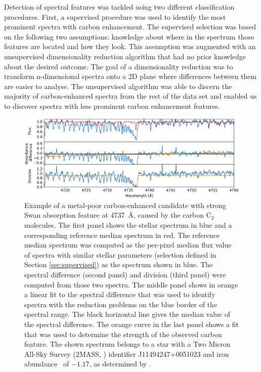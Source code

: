 Detection of spectral features was tackled using two different classification procedures. First, a supervised procedure was used to identify the most prominent spectra with carbon enhancement. The supervised selection was based on the following two assumptions: knowledge about where in the spectrum those features are located and how they look. This assumption was augmented with an unsupervised dimensionality reduction algorithm that had no prior knowledge about the desired outcome. The goal of a dimensionality reduction was to transform n-dimensional spectra onto a 2D plane where differences between them are easier to analyse. The unsupervised algorithm was able to discern the majority of carbon-enhanced spectra from the rest of the data set and enabled us to discover spectra with less prominent carbon enhancement features.

\begin{figure}
	\centering
	\includegraphics[width=\textwidth]{cemp_cand_150412003601009.png}
	\caption{Example of a metal-poor carbon-enhanced candidate with strong Swan absorption feature at 4737~\AA, caused by the carbon C$_2$ molecules. The first panel shows the stellar spectrum in blue and a corresponding reference median spectrum in red. The reference median spectrum was computed as the per-pixel median flux value of spectra with similar stellar parameters (selection defined in Section \ref{sec:supervised}) as the spectrum shown in blue. The spectral difference (second panel) and division (third panel) were computed from those two spectra. The middle panel shows in orange a linear fit to the spectral difference that was used to identify spectra with the reduction problems on the blue border of the spectral range. The black horizontal line gives the median value of the spectral difference. The orange curve in the last panel shows a fit that was used to determine the strength of the observed carbon feature. The shown spectrum belongs to a star with a Two Micron All-Sky Survey (2MASS, \cite{2006AJ....131.1163S}) identifier J11494247+0051023 and iron abundance \Feh\ of $-1.17$, as determined by \TC.}
	\label{fig:carbon_example}
\end{figure}

